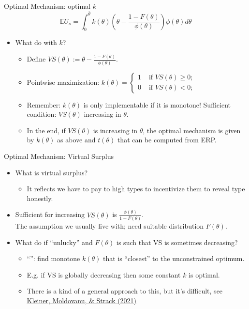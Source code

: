 \documentclass[english,10pt
,aspectratio=169
]{beamer}
\begin{document}
\begin{frame}{Optimal Mechanism: optimal $k$}
\begin{equation*}
	\mathbb{E} U_s = \int_0^{\bar{\theta}} k(\theta) \left( \theta - \frac{1-F(\theta)}{\phi(\theta)} \right) \phi(\theta) d\theta
\end{equation*}
\begin{itemize}
	\item What do with $k$?
	\begin{itemize}[<+->]
		\item Define  $VS(\theta) := \theta - \frac{1-F(\theta)}{\phi(\theta)}$.
		\item Pointwise maximization: 
		$k(\theta) = \begin{cases}
			1 & \text{ if } VS(\theta) \geq 0;
			\\ 0 & \text{ if } VS(\theta) < 0;
		\end{cases}$
		\item Remember: $k(\theta)$ is only implementable if it is monotone! Sufficient condition: $VS(\theta)$ increasing in $\theta$.
		\item In the end, if $VS(\theta)$ is increasing in $\theta$, the optimal mechanism is given by $k(\theta)$ as above and $t(\theta)$ that can be computed from ERP.
	\end{itemize}
\end{itemize}
\end{frame}


\begin{frame}{Optimal Mechanism: Virtual Surplus}
\begin{itemize}
	\item What is virtual surplus?
	\begin{itemize}
		\item It reflects  we have to pay to high types to incentivize them to reveal type honestly.
	\end{itemize}
	\item Sufficient for increasing $VS(\theta)$ is  $\frac{\phi(\theta)}{1-F(\theta)}$. \\ 
	The assumption we usually live with; need suitable distribution $F(\theta)$.
	\item What do if ``unlucky'' and $F(\theta)$ is such that VS is sometimes decreasing?
	\begin{itemize}
		\item ``'': find monotone $k(\theta)$ that is ``closest'' to the unconstrained optimum.
		\item E.g. if VS is globally decreasing then some constant $k$ is optimal.
		\item There is a kind of a general approach to this, but it's difficult, see \href{https://onlinelibrary.wiley.com/doi/abs/10.3982/ECTA18312}{\uline{Kleiner, Moldovanu, \& Strack (2021)}}
	\end{itemize}
\end{itemize}
\end{frame}
\end{document}
